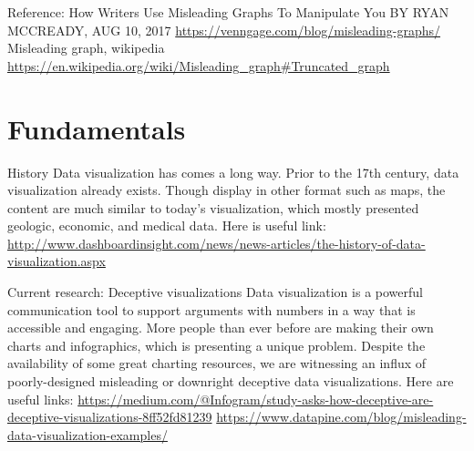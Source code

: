 \documentclass[]{book}
\theoremstyle{definition}
\theoremstyle{definition}
\theoremstyle{definition}
\theoremstyle{remark}
\begin{document}
Reference: How Writers Use Misleading Graphs To Manipulate You BY RYAN
MCCREADY, AUG 10, 2017
\url{https://venngage.com/blog/misleading-graphs/} Misleading graph,
wikipedia
\url{https://en.wikipedia.org/wiki/Misleading_graph\#Truncated_graph}

\chapter{Fundamentals}\label{fundamentals}

History Data visualization has comes a long way. Prior to the 17th
century, data visualization already exists. Though display in other
format such as maps, the content are much similar to today's
visualization, which mostly presented geologic, economic, and medical
data. Here is useful link:
\url{http://www.dashboardinsight.com/news/news-articles/the-history-of-data-visualization.aspx}

Current research: Deceptive visualizations Data visualization is a
powerful communication tool to support arguments with numbers in a way
that is accessible and engaging. More people than ever before are making
their own charts and infographics, which is presenting a unique problem.
Despite the availability of some great charting resources, we are
witnessing an influx of poorly-designed misleading or downright
deceptive data visualizations. Here are useful links:
\url{https://medium.com/@Infogram/study-asks-how-deceptive-are-deceptive-visualizations-8ff52fd81239}
\url{https://www.datapine.com/blog/misleading-data-visualization-examples/}


\end{document}

